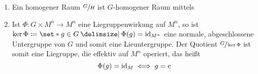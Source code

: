 \begin{bemerkung*}[{name=[Vergleich mit homogenen Räumen]}]
	\begin{enumerate}[1)]
		\item Ein homogener Raum $\sfrac{G}{H}$ ist $G$-homogener Raum mittels
		\item Ist $\Phi \colon G \times M^n \to M^n$ eine Liegruppenwirkung auf $M^n$, so ist $\ker \Phi \coloneqq \set*{g \in G \given \Phi(g) = {\id_{M^n}}}$ eine normale, abgeschlossene Untergruppe von $G$ und somit eine Lieuntergruppe.
		Der Quotient $\sfrac{G}{\ker \Phi}$ ist somit eine Liegruppe, die effektiv auf $M^n$ operiert, das heißt 
		\[
			\Phi(g)= \operatorname{id}_{M} \iff g=e
		\]
	\end{enumerate}
\end{bemerkung*}

